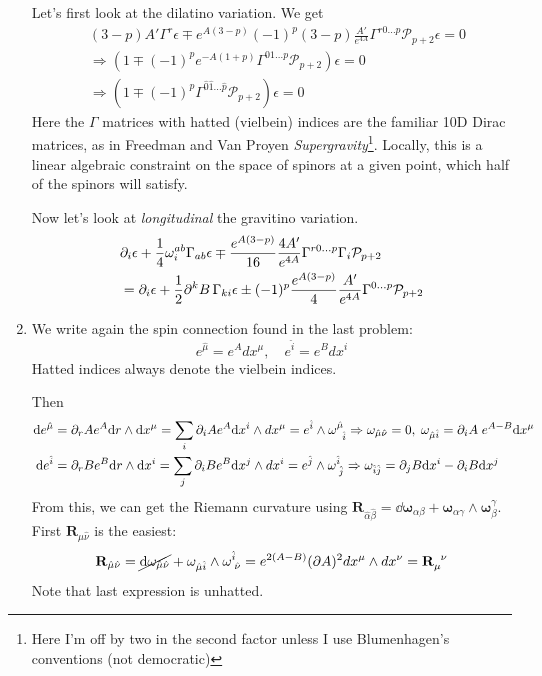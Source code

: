 \documentclass[11pt, class=article, crop=false]{standalone}
\begin{document}
\begin{enumerate}
	Let's first look at the dilatino variation. We get
	\[
	\begin{aligned}
		&(3-p) A' \Gamma^r \epsilon \mp e^{A(3-p)} (-1)^{p} (3-p) \frac{A'}{e^{4A}} \Gamma^{r 0 \dots p} \mathcal P_{p+2} \epsilon = 0\\
		& \Rightarrow (1 \mp (-1)^{p} e^{-A (1 + p)} \Gamma^{0 1 \dots p} \mathcal P_{p+2}) \epsilon = 0\\
		& \Rightarrow (1 \mp (-1)^{p} \Gamma^{\hat 0 \hat 1 \dots \hat p} \mathcal P_{p+2}) \epsilon = 0
	\end{aligned}
	\]
	Here the $\Gamma$ matrices with hatted (vielbein) indices are the familiar 10D Dirac matrices, as in Freedman and Van Proyen \emph{Supergravity}\footnote{Here I'm off by two in the second factor unless I use Blumenhagen's conventions (not democratic)}. 
	Locally, this is a linear algebraic constraint on the space of spinors at a given point, which half of the spinors will satisfy. 
	
	Now let's look at \emph{longitudinal} the gravitino variation. 
	\[
	\begin{aligned}
		& \partial_i \epsilon + \frac14 \omega_i^{ab} \Gamma_{ab} \epsilon \mp \frac{e^{A(3-p)}}{16} \frac{4 A'}{e^{4 A}} \Gamma^{r 0 \dots p} \Gamma_i \mathcal P_{p+2}\\
		&=  \partial_i \epsilon + \frac12 \partial^k B\, \Gamma_{k i}  \epsilon \pm (-1)^p \frac{e^{A(3-p)}}{4} \frac{A'}{e^{4 A}} \Gamma^{0 \dots p} \mathcal P_{p+2}
	\end{aligned}
	\]

	\item We write again the spin connection found in the last problem:
	\[
		e^{\hat \mu} = e^A dx^\mu, \quad e^{\hat i} = e^B dx^{i}
	\]
	Hatted indices always denote the vielbein indices.
	
	Then
	\[
		\begin{aligned}
			\mathrm{d} e^{\hat \mu} &= \partial_r A e^{A} \mathrm{d} r \wedge \mathrm{d} x^\mu = \sum_i \partial_i A e^A \mathrm{d} x^i \wedge dx^\mu = e^{\hat i} \wedge \omega^{\hat \mu}_{\;\; \hat i} \Rightarrow  \omega_{\hat \mu \hat \nu} = 0, \; \omega_{\hat \mu \hat i} = \partial_i A \; e^{A - B} \mathrm{d} x^\mu \\
			\mathrm{d} e^{\hat i} &= \partial_r B e^{B} \mathrm{d} r \wedge \mathrm{d} x^i = \sum_j \partial_i B e^B \mathrm{d} x^j \wedge dx^i = e^{\hat j} \wedge \omega^{\hat i}_{\; \hat j}
			\Rightarrow \omega_{\hat i \hat j} = \partial_j B \mathrm{d} x^i - \partial_i B \mathrm{d} x^j \\
		\end{aligned}
	\]
	From this, we can get the Riemann curvature using $\mathbf{R}_{\hat \alpha \hat \beta} = \dd \boldsymbol{\omega}_{\alpha \beta} + \boldsymbol{\omega}_{\alpha \gamma} \wedge \boldsymbol{\omega}^\gamma_\beta$. First $\mathbf{R}_{\hat \mu \hat \nu}$ is the easiest:
	\[
		\mathbf{R}_{\hat \mu \hat \nu} = \cancel{\mathrm{d} \omega_{\hat \mu \hat \nu}} + \omega_{\hat \mu \hat i} \wedge \omega^{\hat i}_{\; \hat \nu} = e^{2(A-B)} (\partial A)^2 dx^\mu \wedge dx^\nu = \mathbf{R}_{\mu}^{\;\; \nu}
	\]
	Note that last expression is unhatted. 
	

\end{enumerate}
\end{document}
